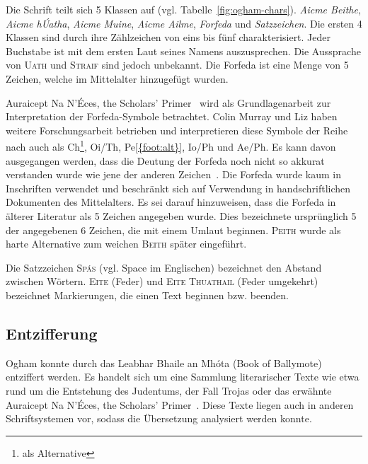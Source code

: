\documentclass[a4paper]{scrartcl}
\newcommand{\character}[1]{\textsc{#1}}
\begin{document}
Die Schrift teilt sich 5 Klassen auf (vgl. Tabelle~\ref{fig:ogham-chars}). \emph{Aicme Beithe}, \emph{Aicme hÚatha}, \emph{Aicme Muine}, \emph{Aicme Ailme}, \emph{Forfeda} und \emph{Satzzeichen}. Die ersten 4 Klassen sind durch ihre Zählzeichen von eins bis fünf charakterisiert. Jeder Buchstabe ist mit dem ersten Laut seines Namens auszusprechen. Die Aussprache von \character{Uath} und \character{Straif} sind jedoch unbekannt. Die Forfeda ist eine Menge von 5 Zeichen, welche im Mittelalter hinzugefügt wurden.

\glqq Auraicept Na N'{\'E}ces, the Scholars' Primer\grqq{}~\cite{auraicept1917} wird als Grundlagenarbeit zur Interpretation der Forfeda-Symbole betrachtet. Colin Murray und Liz haben weitere Forschungsarbeit betrieben und interpretieren diese Symbole der Reihe nach auch als Ch\footnote{\label{foot:alt}als Alternative}, Oi/Th, Pe\cref{{foot:alt}}, Io/Ph und Ae/Ph. Es kann davon ausgegangen werden, dass die Deutung der Forfeda noch nicht so akkurat verstanden wurde wie jene der anderen Zeichen~\cite{forfeda-intro}. Die Forfeda wurde kaum in Inschriften verwendet und beschränkt sich auf Verwendung in handschriftlichen Dokumenten des Mittelalters. Es sei darauf hinzuweisen, dass die Forfeda in älterer Literatur als 5 Zeichen angegeben wurde. Dies bezeichnete ursprünglich 5 der angegebenen 6 Zeichen, die mit einem Umlaut beginnen. \character{Peith} wurde als harte Alternative zum weichen \character{Beith} später eingeführt.

Die Satzzeichen \character{Spás} (vgl. \glqq Space\grqq{} im Englischen) bezeichnet den Abstand zwischen Wörtern. \character{Eite} (Feder) und \character{Eite Thuathail} (Feder umgekehrt) bezeichnet Markierungen, die einen Text beginnen bzw. beenden. 

\subsection{Entzifferung}
%
Ogham konnte durch das \glqq Leabhar Bhaile an Mhóta\grqq{} (\glqq Book of Ballymote\grqq) entziffert werden. Es handelt sich um eine Sammlung literarischer Texte wie etwa rund um die Entstehung des Judentums, der Fall Trojas oder das erwähnte \glqq Auraicept Na N'{\'E}ces, the Scholars' Primer\grqq{}~\cite{ballymote}. Diese Texte liegen auch in anderen Schriftsystemen vor, sodass die Übersetzung analysiert werden konnte.
\end{document}
